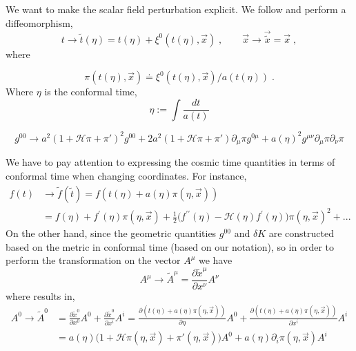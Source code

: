 \documentclass[a4paper,11pt]{article}
\def\be{\begin{equation}}
\def\ee{\end{equation}}
\newcommand{\HH}{\mathcal H}
\begin{document}
We want to make the scalar field perturbation explicit. We follow \cite{Hassani_2019} and perform  a diffeomorphism,  
\be
\label{time_diff}
t \to \tilde t(\eta) = t(\eta)+ \xi^0 (t (\eta) , \vec x) \;, \qquad \vec x \to \vec {\tilde x} = \vec x  \; ,
\ee
where

\be
\pi(t(\eta),\vec x) \doteq \xi^0 (t(\eta),\vec x) /a (t(\eta)) \;.
\ee 
Where $\eta$ is the conformal time,
\be
\eta:=\int \frac{d t}{a (t)}
\ee

\begin{equation}
g^{00} \rightarrow a^2 (1+ \HH \pi +  \pi')^2 g^{00}+2 a^2 (1+  \HH \pi +  \pi')  \partial_{\mu} \pi  g^{0 \mu}+ a(\eta)^2 g^{\mu \nu} \partial_{\mu} \pi \partial_{\nu} \pi
\end{equation}


We have to pay attention to expressing the cosmic time quantities in terms of conformal time when changing coordinates.
For instance,
\begin{align}
f(t) & \to \tilde f(\tilde t) = f(t(\eta) + a(\eta) \pi(\eta ,\vec x)) \\ \nonumber & 
 = f(\eta)+f^{\prime}(\eta) \pi(\eta, \vec{x})+\frac{1}{2} \Big(f^{\prime \prime}(\eta)- \HH(\eta) f^{\prime}(\eta)  \Big) \pi(\eta,\vec x)^{2} + ...
\end{align}
On the other hand, since the geometric quantities $g^{00}$ and $\delta K$ are constructed based on the metric in conformal time (based on our notation), so in order to perform the transformation on the vector $A^{\mu}$ we have
\begin{equation}
A^{\mu} \rightarrow \tilde{A}^{\mu}=\frac{\partial  \tilde{x}^{\mu}}{\partial   x^{\nu}} A^{\nu}
\end{equation}
where results in,
\begin{align}
A^{0} \rightarrow \tilde{A}^{0}& =\frac{\partial  \tilde{x}^{0}}{\partial   x^{0}} A^{0}  + \frac{\partial  \tilde{x}^{0}}{\partial   x^{i}} A^{i} = \frac{\partial  (t(\eta) + a(\eta) \pi (\eta, \vec x))}{\partial   \eta} A^0 +  \frac{\partial  (t(\eta) + a(\eta) \pi (\eta, \vec x))}{\partial   x^i} A^i \\ \nonumber &=a(\eta) \big( 1 + \HH \pi(\eta,\vec x) + \pi'(\eta, \vec x) \Big) A^0 + a(\eta) \partial_i \pi(\eta, \vec x) A^i
\end{align}
\end{document}
